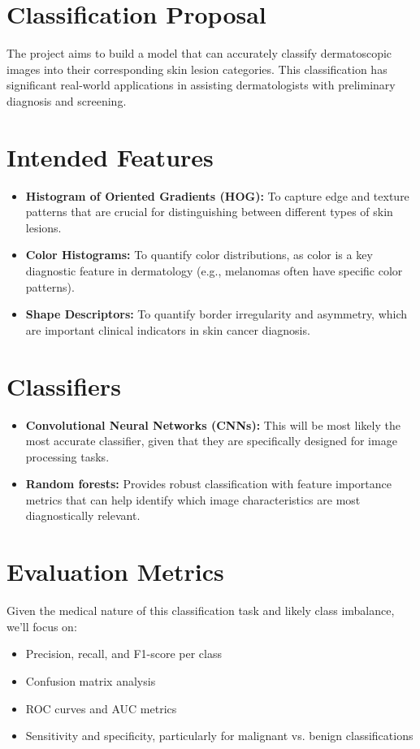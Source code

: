 \documentclass{article}
\begin{document}
\section*{Classification Proposal}
The project aims to build a model that can accurately classify dermatoscopic images into
their corresponding skin lesion categories. This classification has significant real-world
applications in assisting dermatologists with preliminary diagnosis and screening.

\section*{Intended Features}
\begin{itemize}
    \item \textbf{Histogram of Oriented Gradients (HOG):} To capture edge and texture patterns that
    are crucial for distinguishing between different types of skin lesions.
    \item \textbf{Color Histograms:} To quantify color distributions, as color is a key diagnostic feature
    in dermatology (e.g., melanomas often have specific color patterns).
    \item \textbf{Shape Descriptors:} To quantify border irregularity and asymmetry, which are
    important clinical indicators in skin cancer diagnosis.
\end{itemize}

\section*{Classifiers}
\begin{itemize}
    \item \textbf{Convolutional Neural Networks (CNNs):} This will be most likely the most accurate
    classifier, given that they are specifically designed for image processing tasks.
    \item \textbf{Random forests:} Provides robust classification with feature importance metrics that
    can help identify which image characteristics are most diagnostically relevant.
\end{itemize}

\section*{Evaluation Metrics}
Given the medical nature of this classification task and likely class imbalance, we'll focus on:
\begin{itemize}
    \item Precision, recall, and F1-score per class
    \item Confusion matrix analysis
    \item ROC curves and AUC metrics
    \item Sensitivity and specificity, particularly for malignant vs. benign classifications
\end{itemize}
\end{document}
